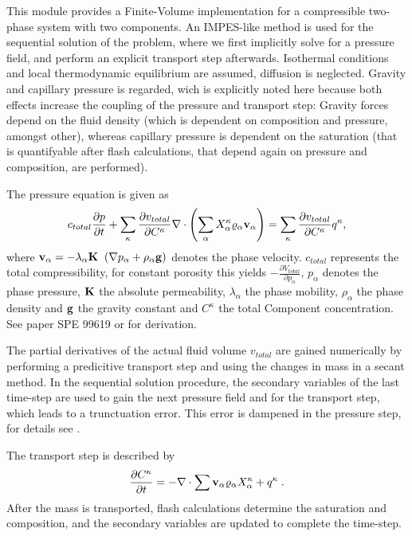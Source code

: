 This module provides a Finite-Volume implementation for a compressible two-phase system with two components. An IMPES-like method is used for the sequential solution of the problem, where we first implicitly solve for a pressure field, and perform an explicit transport step afterwards. Isothermal conditions and local thermodynamic equilibrium are assumed, diffusion is neglected. Gravity and capillary pressure is regarded, wich is explicitly noted here because both effects increase the coupling of the pressure and transport step: Gravity forces depend on the fluid density (which is dependent on composition and pressure, amongst other), whereas capillary pressure is dependent on the saturation (that is quantifyable after flash calculations, that depend again on pressure and composition, are performed).

The pressure equation is given as
\begin{equation}
  c_{total}\frac{\partial p}{\partial t} + \sum_{\kappa} \frac{\partial v_{total}}{\partial C^{\kappa}} \nabla \cdot \left( \sum_{\alpha} X^{\kappa}_{\alpha} \varrho_{\alpha} \bf{v}_{\alpha}\right)
  = \sum_{\kappa} \frac{\partial v_{total}}{\partial C^{\kappa}} q^{\kappa},
\end{equation}
where $\textbf{v}_{\alpha} = - \lambda_{\alpha} \textbf{K } \left(\nabla p_{\alpha} + \rho_{\alpha} \bf{g} \right) $ denotes the phase velocity.
$ c_{total} $ represents the total compressibility, for constant porosity this yields $ - \frac{\partial V_{total}}{\partial p_{\alpha}}$,
$p_{\alpha} $ denotes the phase pressure, $ \bf{K} $ the absolute permeability, $ \lambda_{\alpha} $ the phase mobility,
$ \rho_{\alpha} $ the phase density and $ \bf{g}$ the gravity constant and $ C^{\kappa} $ the total Component concentration.
See paper SPE 99619 or \cite{Chen2000} for derivation.

The partial derivatives of the actual fluid volume $ v_{total} $ are gained numerically by performing a predicitive transport step and using the changes in mass in a secant method. In the sequential solution procedure, the secondary variables of the last time-step
are used to gain the next pressure field and for the transport step, which leads to a trunctuation error. This error is dampened in the pressure step, for details see \cite{Fritz2010}.

The transport step is described by
\[ \frac{\partial C^\kappa}{\partial t} = - \nabla \cdot \sum{{\bf v_\alpha} \varrho_\alpha X_\alpha^\kappa} + q^\kappa \; . \]
After the mass is transported, flash calculations determine the saturation and composition, and the secondary variables are updated to complete the time-step.
